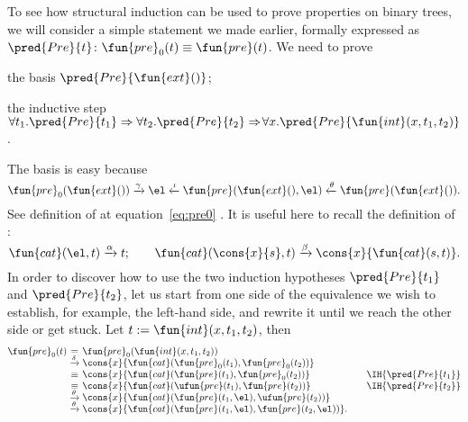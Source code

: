 To see how structural induction can be used to prove properties on
binary trees, we will consider a simple statement we made earlier,
formally expressed as \(\pred{Pre}{t} \colon \fun{pre}_0(t) \equiv
\fun{pre}(t)\).
We need to prove
\begin{itemize*}

  \item the basis \(\pred{Pre}{\fun{ext}()}\);

  \item the inductive step \(\forall t_1.\pred{Pre}{t_1} \Rightarrow
    \forall t_2.\pred{Pre}{t_2} \Rightarrow \! \forall
    x.\pred{Pre}{\fun{int}(x,t_1,t_2)}\).

\end{itemize*}
The basis is easy because
\begin{equation*}
  \fun{pre}_0(\fun{ext}())
  \xrightarrow{\smash{\gamma}} \el \xleftarrow{\smash{\iota}}
  \fun{pre}(\fun{ext}(),\el) \xleftarrow{\smash{\theta}}
  \fun{pre}(\fun{ext}()).
\end{equation*}
See definition of  at
equation~\eqref{eq:pre0} . It is useful here to
recall the definition of :
\begin{equation*}
\fun{cat}(\el,t) \xrightarrow{\smash{\alpha}} t;
\qquad
\fun{cat}(\cons{x}{s},t) \xrightarrow{\smash{\beta}}
\cons{x}{\fun{cat}(s,t)}.
\end{equation*}
In order to discover how to use the two induction hypotheses
\(\pred{Pre}{t_1}\) and \(\pred{Pre}{t_2}\),
let us start from one side of the equivalence we wish to establish,
for example, the left\hyp{}hand side, and rewrite it until we reach
the other side or get stuck. Let \(t := \fun{int}(x,t_1,t_2)\), then
\begin{equation*}
\begin{array}{@{}r@{\;}c@{\;}l@{\qquad}r@{}}
\fun{pre}_0(t)
& = & \fun{pre}_0(\fun{int}(x,t_1,t_2)) \\
& \xrightarrow{\smash{\delta}}
& \cons{x}{\fun{cat}(\fun{pre}_0(t_1), \fun{pre}_0(t_2))}\\
& \equiv & \cons{x}{\fun{cat}(\fun{pre}(t_1), \fun{pre}_0(t_2))}
& \IH{\pred{Pre}{t_1}}\\
& \equiv & \cons{x}{\fun{cat}(\ufun{pre}(t_1), \fun{pre}(t_2))}
& \IH{\pred{Pre}{t_2}}\\
& \xrightarrow{\smash{\theta}}
& \cons{x}{\fun{cat}(\fun{pre}(t_1,\el), \ufun{pre}(t_2))}\\
& \xrightarrow{\smash{\theta}}
& \cons{x}{\fun{cat}(\fun{pre}(t_1,\el), \fun{pre}(t_2,\el))}.
\end{array}
\end{equation*}
